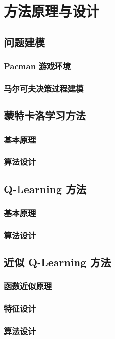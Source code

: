 \section{方法原理与设计}

\subsection{问题建模}

\subsubsection{Pacman 游戏环境}

\subsubsection{马尔可夫决策过程建模}


\subsection{蒙特卡洛学习方法}

\subsubsection{基本原理}

\subsubsection{算法设计}


\subsection{Q-Learning 方法}

\subsubsection{基本原理}

\subsubsection{算法设计}


\subsection{近似 Q-Learning 方法}

\subsubsection{函数近似原理}

\subsubsection{特征设计}

\subsubsection{算法设计}

